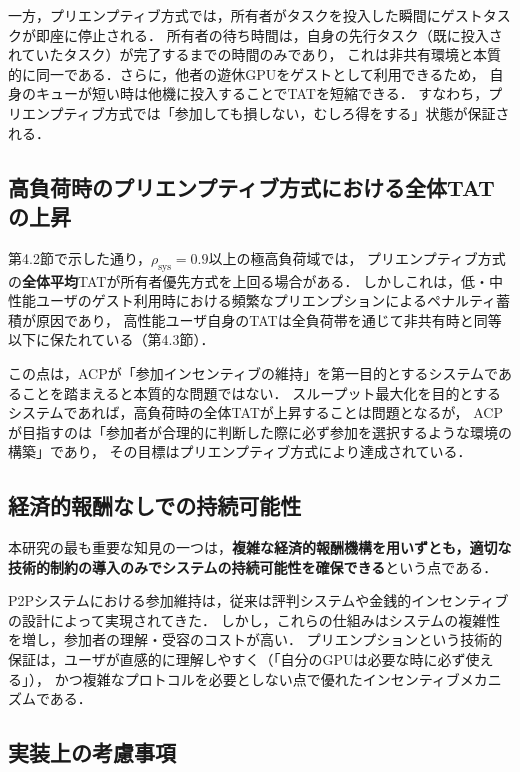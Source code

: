 \documentclass[12pt,a4paper]{jsarticle}
\begin{document}
一方，プリエンプティブ方式では，所有者がタスクを投入した瞬間にゲストタスクが即座に停止される．
所有者の待ち時間は，自身の先行タスク（既に投入されていたタスク）が完了するまでの時間のみであり，
これは非共有環境と本質的に同一である．さらに，他者の遊休GPUをゲストとして利用できるため，
自身のキューが短い時は他機に投入することでTATを短縮できる．
すなわち，プリエンプティブ方式では「参加しても損しない，むしろ得をする」状態が保証される．

\subsection{高負荷時のプリエンプティブ方式における全体TATの上昇}

第4.2節で示した通り，$\rho_\mathrm{sys} = 0.9$以上の極高負荷域では，
プリエンプティブ方式の\textbf{全体平均}TATが所有者優先方式を上回る場合がある．
しかしこれは，低・中性能ユーザのゲスト利用時における頻繁なプリエンプションによるペナルティ蓄積が原因であり，
高性能ユーザ自身のTATは全負荷帯を通じて非共有時と同等以下に保たれている（第4.3節）．

この点は，ACPが「参加インセンティブの維持」を第一目的とするシステムであることを踏まえると本質的な問題ではない．
スループット最大化を目的とするシステムであれば，高負荷時の全体TATが上昇することは問題となるが，
ACPが目指すのは「参加者が合理的に判断した際に必ず参加を選択するような環境の構築」であり，
その目標はプリエンプティブ方式により達成されている．

\subsection{経済的報酬なしでの持続可能性}

本研究の最も重要な知見の一つは，\textbf{複雑な経済的報酬機構を用いずとも，適切な技術的制約の導入のみでシステムの持続可能性を確保できる}という点である．

P2Pシステムにおける参加維持は，従来は評判システムや金銭的インセンティブの設計によって実現されてきた\cite{feldman2004robust}．
しかし，これらの仕組みはシステムの複雑性を増し，参加者の理解・受容のコストが高い．
プリエンプションという技術的保証は，ユーザが直感的に理解しやすく（「自分のGPUは必要な時に必ず使える」），
かつ複雑なプロトコルを必要としない点で優れたインセンティブメカニズムである．

\subsection{実装上の考慮事項}
\end{document}
